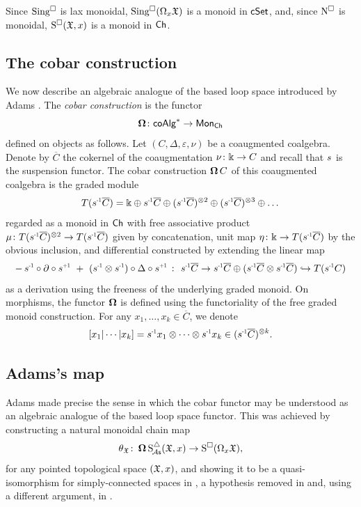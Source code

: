 Since $\operatorname{Sing^{\square}}$ is lax monoidal, $\operatorname{Sing^{\square}}(\Omega_x \mathfrak{X})$ is a monoid in $\mathsf{cSet}$, and, since $\operatorname{N^{\square}}$ is monoidal, $\operatorname{S^{\square}}(\mathfrak{X},x)$ is a monoid in $\mathsf{Ch}$.

\subsection{The cobar construction}\label{ss:cobar construction}

We now describe an algebraic analogue of the based loop space introduced by Adams \cite{adams1956cobar}.
The \textit{cobar construction} is the functor
\[
\operatorname{\mathbf{\Omega}} \colon \mathsf{coAlg}^\ast \to \mathsf{Mon}_{\mathsf{Ch}}
\]
defined on objects as follows.
Let $(C, \Delta, \varepsilon, \nu)$ be a coaugmented coalgebra.
Denote by $\overline{C}$ the cokernel of the coaugmentation $\nu \colon \Bbbk \to C$ and recall that $\s{}$ is the suspension functor.
The cobar construction $\operatorname{\mathbf{\Omega}} C$ of this coaugmented coalgebra is the graded module
\[
T(\s{-1} \overline{C}) =
\k \oplus \s{-1}\overline{C} \oplus (\s{-1}\overline{C})^{\ot 2} \oplus (\s{-1}\overline{C})^{\ot 3} \oplus \dots
\]
regarded as a monoid in $\mathsf{Ch}$ with free associative product $\mu \colon T(\s{-1} \overline{C})^{\ot 2} \to T(\s{-1} \overline{C})$ given by concatenation, unit map $\eta \colon \k \to T(\s{-1} \overline{C})$ by the obvious inclusion, and differential constructed by extending the linear map
\[
-\, \s{-1} \circ \partial \circ \s{+1} \ + \ (\s{-1} \ot \s{-1}) \circ \Delta \circ \s{+1} \ \colon \
\s{-1} \overline{C} \to \s{-1}\overline{C} \oplus (\s{-1}\overline{C} \ot \s{-1}\overline{C}) \hookrightarrow T(\s{-1}C)
\]
as a derivation using the freeness of the underlying graded monoid.
On morphisms, the functor $\operatorname{\mathbf{\Omega}}$ is defined using the functoriality of the free graded monoid construction.
For any $x_1, \dots, x_k \in \overline{C}$, we denote
\[
[x_1| \cdots | x_k]= \s{-1} x_1 \otimes \cdots \otimes \s{-1}x_k \in (\s{-1}\overline{C})^{\otimes k}.
\]

\subsection{Adams's map}\label{ss:adams maps}

Adams made precise the sense in which the cobar functor may be understood as an algebraic analogue of the based loop space functor. This was achieved by constructing a natural monoidal chain map
\begin{equation}\label{e:adams map 2}
	\theta_{\mathfrak{X}} \colon \operatorname{\mathbf{\Omega}} \operatorname{S^{\triangle}_{\!{\mathcal{A}\mathsf{s}}}}(\mathfrak{X},x) \to \operatorname{S^{\square}}(\Omega_x \mathfrak{X}),
\end{equation}
for any pointed topological space $(\mathfrak{X},x)$, and showing it to be a quasi-isomorphism for simply-connected spaces in \cite{adams1956cobar}, a hypothesis removed in \cite{rivera2018cubical} and, using a different argument, in \cite{rivera2019path}.

